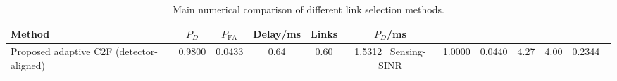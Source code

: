\begin{table}[t]
    \centering
    \caption{Main numerical comparison of different link selection methods.}
    \label{tab:main_summary}
    \begin{tabular}{l c c c c c}
        \hline
        Method & $P_D$ & $P_{\mathrm{FA}}$ & Delay/ms & Links & $P_D$/ms \\
        \hline
        Proposed adaptive C2F (detector-aligned) & 0.9800 & 0.0433 & 0.64 & 0.60 & 1.5312 \
        Sensing-SINR & 1.0000 & 0.0440 & 4.27 & 4.00 & 0.2344 \
        \hline
    \end{tabular}
\end{table}
